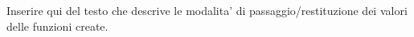 \documentclass[../Relazione.tex]{subfiles}
\begin{document}
Inserire qui del testo che descrive
le modalita' di passaggio/restituzione
dei valori delle funzioni create.
\end{document}

